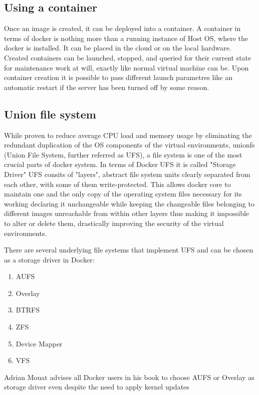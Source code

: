 \subsection{Using a container}

Once an image is created, it can be deployed into a container. A
container in terms of docker is nothing more than a running
instance of Host OS, where the docker is installed. It can be placed
in the cloud or on the local hardware.
Created containers can be launched, stopped, and queried for their
current state for maintenance work at will, exactly like normal virtual
machine can be. Upon container creation it is possible to pass
different launch parametres like an automatic restart if the server
has been turned off by some reason\cite{AdrMouContainerUsage:2016}.

\subsection{Union file system}

While proven to reduce average CPU load and memory usage by
eliminating the redundant duplication of the OS components of the
virtual environments,
unionfs (Union File System, further referred as UFS), a file system
is one of the most crucial parts of docker system.
In terms of Docker UFS it is called "Storage Driver"\cite{AdrMouUFS:2016}
UFS consits of "layers", abstract file system units clearly separated
from each other, with some of them write-protected. This allows
docker core to maintain one and the only copy of the operating
system files necessary for its working declaring it unchangeable
while keeping the changeable files belonging to different images
unreachable from within other layers thus making it impossible to
alter or delete them, drastically improving the security of the virtual
environments.

There are several underlying file systems that
implement UFS and can be chosen as a storage
driver in Docker\cite{AdrMouUFS:2016}:
\begin{enumerate}
\item AUFS
\item Overlay
\item BTRFS
\item ZFS
\item Device Mapper
\item VFS
\end{enumerate}

Adrian Mouat advises all Docker users in his book
to choose AUFS or Overlay as storage
driver even despite the need
to apply kernel updates\cite{AdrMouUFSAdvise:2016}

